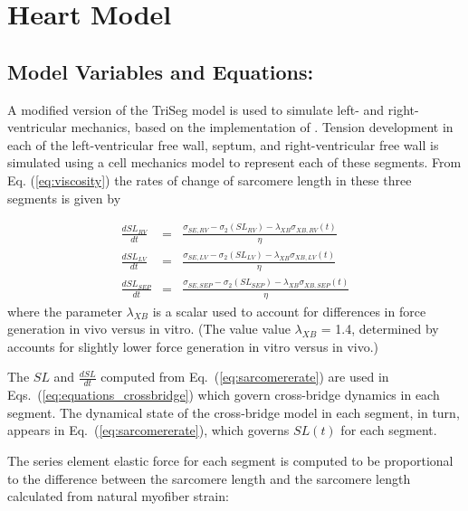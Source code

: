\documentclass[fleqn,10pt]{physiome}
\begin{document}
\section{Heart Model}

\subsection{Model Variables and Equations:}

A modified version of the \cite{Lumens2009} TriSeg model is used to simulate left- and right-ventricular mechanics, based on the implementation of \cite{Tewari2016b}. Tension development in each of the left-ventricular free wall, septum, and right-ventricular free wall is simulated using a cell mechanics model to represent each of these segments. From Eq. (\ref{eq:viscosity}) the rates of change of sarcomere length in these three segments is given by

\begin{eqnarray}\label{eq:sarcomererate}
\frac{dSL_{RV}}{dt} &=& \frac{\sigma_{SE,RV} - \sigma_{2}(SL_{RV}) - \lambda_{XB}\sigma_{XB,RV}(t)}{\eta}     \nonumber \\
\frac{dSL_{LV}}{dt} &=& \frac{\sigma_{SE,LV} - \sigma_{2}(SL_{LV}) - \lambda_{XB}\sigma_{XB,LV}(t)}{\eta}     \nonumber \\
\frac{dSL_{SEP}}{dt} &=& \frac{\sigma_{SE,SEP} - \sigma_{2}(SL_{SEP}) - \lambda_{XB}\sigma_{XB,SEP}(t)}{\eta}
\end{eqnarray}
where the parameter $\lambda_{XB}$ is a scalar used to account for differences in force generation in vivo versus in vitro. (The value value $\lambda_{XB}$ = 1.4, determined by \cite{Tewari2016b} accounts for slightly lower force generation in vitro versus in vivo.)

The $SL$ and $\frac{dSL}{dt}$ computed from Eq.~(\ref{eq:sarcomererate}) are used in Eqs.~(\ref{eq:equations_crossbridge}) which govern cross-bridge dynamics in each segment. The dynamical state of the cross-bridge model in each segment, in turn, appears in Eq.~(\ref{eq:sarcomererate}), which governs $SL(t)$ for each segment.

The series element elastic force for each segment is computed to be proportional to the difference between the sarcomere length and the sarcomere length calculated from natural myofiber strain:
\end{document}
